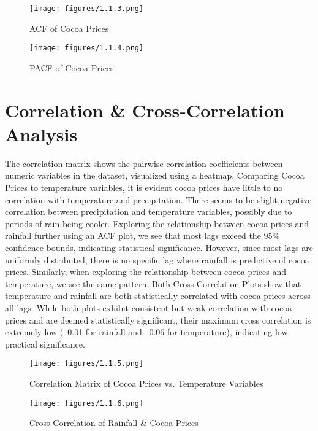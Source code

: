 \begin{figure}[!ht]
    \centering
    \texttt{[image: figures/1.1.3.png]}
    \caption{ACF of Cocoa Prices}
    \label{fig:chart_a}
\end{figure}

\begin{figure}[!ht]
    \centering
    \texttt{[image: figures/1.1.4.png]}
    \caption{PACF of Cocoa Prices}
    \label{fig:chart_a}
\end{figure}


\section{Correlation \& Cross-Correlation Analysis}
The correlation matrix shows the pairwise correlation coefficients between numeric variables in the dataset, visualized using a heatmap. Comparing Cocoa Prices to temperature variables, it is evident cocoa prices have little to no correlation with temperature and precipitation. There seems to be slight negative correlation between precipitation and temperature variables, possibly due to periods of rain being cooler. Exploring the relationship between cocoa prices and rainfall further using an ACF plot, we see that most lags exceed the 95\% confidence bounds, indicating statistical significance. However, since most lags are uniformly distributed, there is no specific lag where rainfall is predictive of cocoa prices. Similarly, when exploring the relationship between cocoa prices and temperature, we see the same pattern. Both Cross-Correlation Plots show that temperature and rainfall are both statistically correlated with cocoa prices across all lags. While both plots exhibit consistent but weak correlation with cocoa prices and are deemed statistically significant, their maximum cross correlation is extremely low (~0.01 for rainfall and ~0.06 for temperature), indicating low practical significance. 
\begin{figure}[!ht]
    \centering
    \texttt{[image: figures/1.1.5.png]}
    \caption{Correlation Matrix of Cocoa Prices vs. Temperature Variables}
    \label{fig:chart_a}
\end{figure}

\begin{figure}[!ht]
    \centering
    \texttt{[image: figures/1.1.6.png]}
    \caption{Cross-Correlation of Rainfall \& Cocoa Prices}
    \label{fig:chart_a}
\end{figure}

